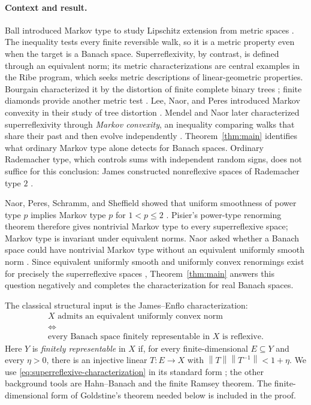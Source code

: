 \documentclass[11pt]{article}
\theoremstyle{definition}
\theoremstyle{remark}
\newcommand{\norm}[1]{\left\lVert #1\right\rVert}
\begin{document}
\paragraph{Context and result.}
Ball introduced Markov type to study Lipschitz extension from metric
spaces \cite{Ball}. The inequality tests every finite reversible walk,
so it is a metric property even when the target is a Banach space.
Superreflexivity, by contrast, is defined through an equivalent norm;
its metric characterizations are central examples in the Ribe program,
which seeks metric descriptions of linear-geometric properties.
Bourgain characterized it by the distortion of finite complete binary trees
\cite{Bourgain}; finite diamonds provide another metric test
\cite{JohnsonSchechtman}. Lee, Naor, and Peres introduced Markov
convexity in their study of tree distortion \cite{LeeNaorPeres}.
Mendel and Naor later characterized superreflexivity through
\emph{Markov convexity}, an inequality comparing walks that share their
past and then evolve independently \cite{MendelNaor}.
Theorem~\ref{thm:main} identifies what ordinary
Markov type alone detects for Banach spaces.
Ordinary Rademacher type, which controls sums with independent random
signs, does not suffice for this conclusion: James constructed
nonreflexive spaces of Rademacher type $2$ \cite{JamesType2}.

Naor, Peres, Schramm, and Sheffield showed that uniform smoothness of
power type $p$ implies Markov type $p$ for $1<p\leq2$ \cite{NPSS}.
Pisier's power-type renorming theorem \cite{Pisier} therefore gives
nontrivial Markov type to every superreflexive space; Markov type is
invariant under equivalent norms. Naor asked whether a Banach space
could have nontrivial Markov type without an equivalent uniformly smooth
norm \cite[Question~4]{Naor}. Since equivalent uniformly smooth and
uniformly convex renormings exist for precisely the superreflexive
spaces \cite{Pisier}, Theorem~\ref{thm:main} answers this question
negatively and completes the characterization for real Banach spaces.

The classical structural input is the James--Enflo characterization:
\begin{equation}\label{eq:superreflexive-characterization}
 \begin{gathered}
 X\text{ admits an equivalent uniformly convex norm}\\
 \Longleftrightarrow\\
 \text{every Banach space finitely representable in }X
 \text{ is reflexive}.
 \end{gathered}
\end{equation}
Here $Y$ is \emph{finitely representable} in $X$ if, for every
finite-dimensional $E\subseteq Y$ and every $\eta>0$, there is an
injective linear $T:E\to X$ with
$\norm{T}\norm{T^{-1}}<1+\eta$.
We use \eqref{eq:superreflexive-characterization} in its standard form
\cite{James,Enflo}; the other background tools are Hahn--Banach and the
finite Ramsey theorem. The finite-dimensional form of Goldstine's theorem
needed below is included in the proof.
\end{document}

